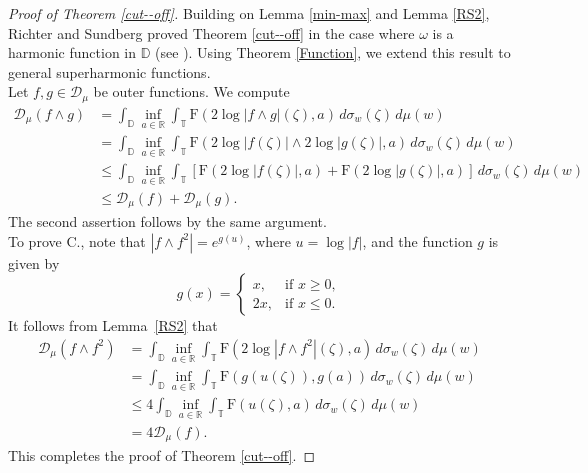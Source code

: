 \documentclass[12pt,reqno,a4paper]{amsart}
\newcommand{\FF}{\mathrm{F}}
\newcommand{\cD}{{\mathcal{D}}}
\numberwithin{equation}{section}
\begin{document}
\begin{proof}[Proof of Theorem \ref{cut--off}]
	Building on Lemma \ref{min-max} and Lemma \ref{RS2}, Richter and Sundberg proved Theorem \ref{cut--off} in the case where \(\omega\) is a harmonic function in \(\mathbb{D}\) (see \cite{RS2}). Using Theorem \ref{Function}, we extend this result to general superharmonic functions.\\
	Let \( f, g \in \cD_\mu \) be outer functions. We compute
	\begin{align*}
		\cD_\mu(f \wedge g) &= \int_{\mathbb{D}} \inf_{a \in \mathbb{R}} \int_{\mathbb{T}} \FF(2\log|f \wedge g|(\zeta), a) \, d\sigma_w(\zeta) \, d\mu(w) \\
		&= \int_{\mathbb{D}} \inf_{a \in \mathbb{R}} \int_{\mathbb{T}} \FF(2\log|f(\zeta)| \wedge 2\log|g(\zeta)|, a) \, d\sigma_w(\zeta) \, d\mu(w) \\
		&\leq \int_{\mathbb{D}} \inf_{a \in \mathbb{R}} \int_{\mathbb{T}} \left[\FF(2\log|f(\zeta)|, a) + \FF(2\log|g(\zeta)|, a)\right] \, d\sigma_w(\zeta) \, d\mu(w) \\
		&\leq \cD_\mu(f) + \cD_\mu(g).
	\end{align*}
	The second assertion follows by the same argument.\\
	To prove \(\mathrm{C.}\), note that \( |f \wedge f^2| = e^{g(u)} \), where \( u = \log|f| \), and the function \( g \) is given by
	\[
	g(x) =
	\begin{cases}
		x, & \text{if } x \geq 0, \\
		2x, & \text{if } x \leq 0.
	\end{cases}
	\]
	It follows from Lemma~\ref{RS2} that
	\begin{align*}
		\cD_\mu(f \wedge f^2) &= \int_{\mathbb{D}} \inf_{a \in \mathbb{R}} \int_{\mathbb{T}} \FF(2\log|f \wedge f^2|(\zeta), a) \, d\sigma_w(\zeta)\, d\mu(w) \\
		&= \int_{\mathbb{D}} \inf_{a \in \mathbb{R}} \int_{\mathbb{T}} \FF(g(u(\zeta)), g(a)) \, d\sigma_w(\zeta) \, d\mu(w) \\
		&\leq 4 \int_{\mathbb{D}} \inf_{a \in \mathbb{R}} \int_{\mathbb{T}} \FF(u(\zeta), a) \, d\sigma_w(\zeta) \, d\mu(w) \\
		&= 4 \cD_\mu(f).
	\end{align*}
	This completes the proof of Theorem \ref{cut--off}.
\end{proof}
\end{document}
